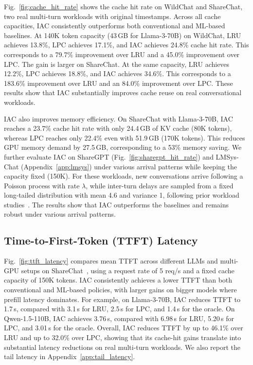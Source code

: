 \documentclass{article}
\newcommand{\hasan}[1]{\textcolor{blue}{[Hasan: #1]}}
\newcommand{\bo}[1]{\textcolor{red}{[Bo: #1]}}
\begin{document}
Fig.~\ref{fig:cache_hit_rate} shows the cache hit rate on WildChat and ShareChat, two real multi-turn workloads with original timestamps. Across all cache capacities, IAC consistently outperforms both conventional and ML-based baselines. At 140K token capacity (43\,GB for Llama-3-70B) on WildChat, LRU achieves 13.8\%, LPC achieves 17.1\%, and IAC achieves 24.8\% cache hit rate. This corresponds to a 79.7\% improvement over LRU and a 45.0\% improvement over LPC. The gain is larger on ShareChat. At the same capacity, LRU achieves 12.2\%, LPC achieves 18.8\%, and IAC achieves 34.6\%. This corresponds to a 183.6\% improvement over LRU and an 84.0\% improvement over LPC. These results show that IAC substantially improves cache reuse on real conversational workloads.

IAC also improves memory efficiency. On ShareChat with Llama-3-70B, IAC reaches a 23.7\% cache hit rate with only 24.4\,GB of KV cache (80K tokens), whereas LPC reaches only 22.4\% even with 51.9\,GB (170K tokens). This reduces GPU memory demand by 27.5\,GB, corresponding to a 53\% memory saving. 
We further evaluate IAC on ShareGPT (Fig.~\ref{fig:sharegpt_hit_rate}) and LMSys-Chat (Appendix~\ref{app:lmsys}) under various arrival patterns while keeping the capacity fixed (150K). For these workloads, new conversations arrive following a Poisson process with rate \(\lambda\), while inter-turn delays are sampled from a fixed long-tailed distribution with mean 4.6 and variance 1, following prior workload studies~\cite{servegen}. The results show that IAC outperforms the baselines and remains robust under various arrival patterns.






\vspace{-5pt}

\subsection{Time-to-First-Token (TTFT) Latency}
\label{sec:ttft}

\vspace{-5pt}

Fig.~\ref{fig:ttft_latency} compares mean TTFT across different LLMs and multi-GPU setups on ShareChat~\cite{yan2025sharechat}, using a request rate of 5 req/s and a fixed cache capacity of 150K tokens. IAC consistently achieves a lower TTFT than both conventional and ML-based policies, with larger gains on bigger models where prefill latency dominates. For example, on Llama-3-70B, IAC reduces TTFT to 1.7\,s, compared with 3.1\,s for LRU, 2.5\,s for LPC, and 1.4\,s for the oracle. On Qwen-1.5-110B, IAC achieves 3.76\,s, compared with 6.98\,s for LRU, 5.20\,s for LPC, and 3.01\,s for the oracle. Overall, IAC reduces TTFT by up to 46.1\% over LRU and up to 32.0\% over LPC, showing that its cache-hit gains translate into substantial latency reductions on real multi-turn workloads. We also report the tail latency in Appendix~\ref{app:tail_latency}.
\end{document}
